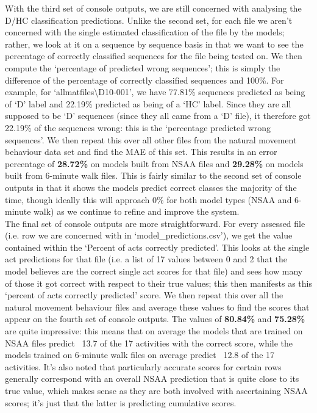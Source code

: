 \documentclass[12pt,twoside]{report}
\begin{document}
\quad With the third set of console outputs, we are still concerned with analysing the D/HC classification predictions. Unlike the second set, for each file we aren’t concerned with the single estimated classification of the file by the models; rather, we look at it on a sequence by sequence basis in that we want to see the percentage of correctly classified sequences for the file being tested on. We then compute the ‘percentage of predicted wrong sequences’; this is simply the difference of the percentage of correctly classified sequences and 100\%. For example, for ‘allmatfiles\textbackslash D10-001’, we have 77.81\% sequences predicted as being of ‘D’ label and 22.19\% predicted as being of a ‘HC’ label. Since they are all supposed to be ‘D’ sequences (since they all came from a ‘D’ file), it therefore got 22.19\% of the sequences wrong: this is the ‘percentage predicted wrong sequences’. We then repeat this over all other files from the natural movement behaviour data set and find the MAE of this set. This results in an error percentage of \textbf{28.72\%} on models built from NSAA files and \textbf{29.28\%} on models built from 6-minute walk files. This is fairly similar to the second set of console outputs in that it shows the models predict correct classes the majority of the time, though ideally this will approach 0\% for both model types (NSAA and 6-minute walk) as we continue to refine and improve the system.\\

\quad The final set of console outputs are more straightforward. For every assessed file (i.e. row we are concerned with in ‘model\_predictions.csv’), we get the value contained within the ‘Percent of acts correctly predicted’. This looks at the single act predictions for that file (i.e. a list of 17 values between 0 and 2 that the model believes are the correct single act scores for that file) and sees how many of those it got correct with respect to their true values; this then manifests as this ‘percent of acts correctly predicted’ score. We then repeat this over all the natural movement behaviour files and average these values to find the scores that appear on the fourth set of console outputs. The values of \textbf{80.84\%} and \textbf{75.28\%} are quite impressive: this means that on average the models that are trained on NSAA files predict ~13.7 of the 17 activities with the correct score, while the models trained on 6-minute walk files on average predict ~12.8 of the 17 activities. It’s also noted that particularly accurate scores for certain rows generally correspond with an overall NSAA prediction that is quite close to its true value, which makes sense as they are both involved with ascertaining NSAA scores; it’s just that the latter is predicting cumulative scores.
\end{document}
